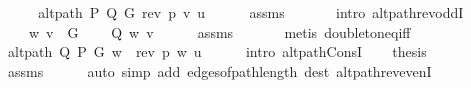 \begin{isabellebody}
\endisataginvisible
{\isafoldinvisible}%
%
\isadeliminvisible
\isanewline
%
\endisadeliminvisible
%
\isadelimproof
%
\endisadelimproof
%
\isatagproof
{}\isamarkupfalse%
\ {\isacharminus}{\kern0pt}\isanewline
\ \ \isamarkupfalse%
\ {\isachardoublequoteopen}alt{\isacharunderscore}{\kern0pt}path\ P\ Q\ G\ {\isacharparenleft}{\kern0pt}rev\ p{\isacharparenright}{\kern0pt}\ v\ u{\isachardoublequoteclose}\isanewline
\ \ \ \ \isamarkupfalse%
\ assms{\isacharparenleft}{\kern0pt}{}{\isacharcomma}{\kern0pt}\ {}{\isacharparenright}{\kern0pt}\isanewline
\ \ \ \ \isamarkupfalse%
\ {\isacharparenleft}{\kern0pt}intro\ alt{\isacharunderscore}{\kern0pt}path{\isacharunderscore}{\kern0pt}rev{\isacharunderscore}{\kern0pt}oddI{\isacharparenright}{\kern0pt}\isanewline
\ \ \isamarkupfalse%
\ \isamarkupfalse%
\isanewline
\ \ \ \ {\isachardoublequoteopen}{\isacharbraceleft}{\kern0pt}w{\isacharcomma}{\kern0pt}\ v{\isacharbraceright}{\kern0pt}\ {\isasymin}\ G{\isachardoublequoteclose}\isanewline
\ \ \ \ {\isachardoublequoteopen}Q\ {\isacharbraceleft}{\kern0pt}w{\isacharcomma}{\kern0pt}\ v{\isacharbraceright}{\kern0pt}{\isachardoublequoteclose}\isanewline
\ \ \ \ \isamarkupfalse%
\ assms{\isacharparenleft}{\kern0pt}{}{\isacharcomma}{\kern0pt}\ {}{\isacharparenright}{\kern0pt}\isanewline
\ \ \ \ \isamarkupfalse%
\ {\isacharparenleft}{\kern0pt}metis\ doubleton{\isacharunderscore}{\kern0pt}eq{\isacharunderscore}{\kern0pt}iff{\isacharparenright}{\kern0pt}{\isacharplus}{\kern0pt}\isanewline
\ \ \isamarkupfalse%
\ \isamarkupfalse%
\ {\isachardoublequoteopen}alt{\isacharunderscore}{\kern0pt}path\ Q\ P\ G\ {\isacharparenleft}{\kern0pt}w\ {\isacharhash}{\kern0pt}\ rev\ p{\isacharparenright}{\kern0pt}\ w\ u{\isachardoublequoteclose}\isanewline
\ \ \ \ \isamarkupfalse%
\ {\isacharparenleft}{\kern0pt}intro\ alt{\isacharunderscore}{\kern0pt}path{\isacharunderscore}{\kern0pt}ConsI{\isacharparenright}{\kern0pt}\isanewline
\ \ \isamarkupfalse%
\ {\isacharquery}{\kern0pt}thesis\isanewline
\ \ \ \ \isamarkupfalse%
\ assms{\isacharparenleft}{\kern0pt}{}{\isacharparenright}{\kern0pt}\isanewline
\ \ \ \ \isamarkupfalse%
\ {\isacharparenleft}{\kern0pt}auto\ simp\ add{\isacharcolon}{\kern0pt}\ edges{\isacharunderscore}{\kern0pt}of{\isacharunderscore}{\kern0pt}path{\isacharunderscore}{\kern0pt}length\ dest{\isacharcolon}{\kern0pt}\ alt{\isacharunderscore}{\kern0pt}path{\isacharunderscore}{\kern0pt}rev{\isacharunderscore}{\kern0pt}evenI{\isacharparenright}{\kern0pt}\isanewline

\end{isabellebody}
